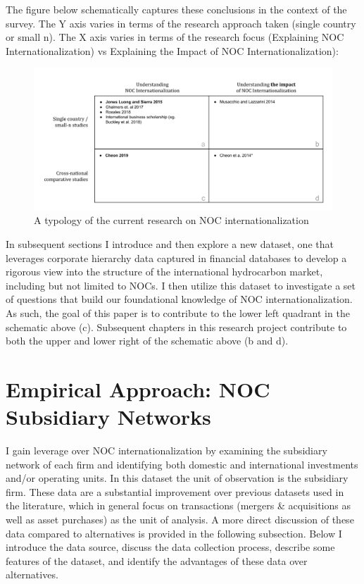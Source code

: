 \documentclass[11pt,]{book}
\begin{document}
The figure below schematically captures these conclusions in the context of the survey. The Y axis varies in terms of the research approach taken (single country or small n). The X axis varies in terms of the research focus (Explaining NOC Internationalization) vs Explaining the Impact of NOC Internationalization):

\begin{figure}

{\centering \includegraphics[width=1\linewidth]{fig/typology} 

}

\caption{A typology of the current research on NOC internationalization}\label{fig:typology}
\end{figure}

In subsequent sections I introduce and then explore a new dataset, one that leverages corporate hierarchy data captured in financial databases to develop a rigorous view into the structure of the international hydrocarbon market, including but not limited to NOCs. I then utilize this dataset to investigate a set of questions that build our foundational knowledge of NOC internationalization. As such, the goal of this paper is to contribute to the lower left quadrant in the schematic above (c). Subsequent chapters in this research project contribute to both the upper and lower right of the schematic above (b and d).

\hypertarget{approach01}{%
\section{Empirical Approach: NOC Subsidiary Networks}\label{approach01}}

I gain leverage over NOC internationalization by examining the subsidiary network of each firm and identifying both domestic and international investments and/or operating units. In this dataset the unit of observation is the subsidiary firm. These data are a substantial improvement over previous datasets used in the literature, which in general focus on transactions (mergers \& acquisitions as well as asset purchases) as the unit of analysis. A more direct discussion of these data compared to alternatives is provided in the following subsection. Below I introduce the data source, discuss the data collection process, describe some features of the dataset, and identify the advantages of these data over alternatives.
\end{document}
